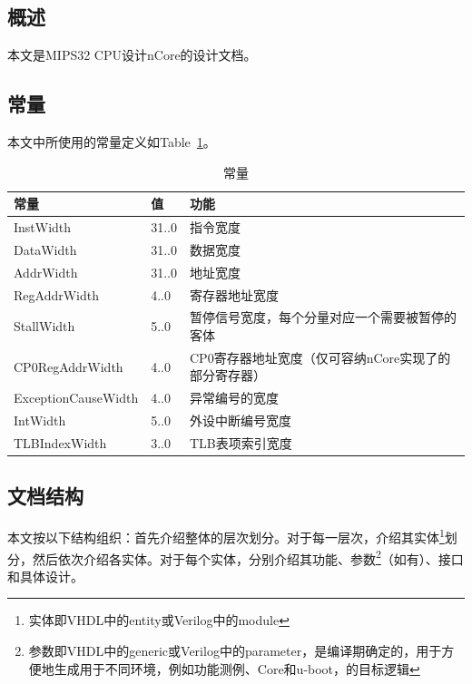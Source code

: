 \documentclass{article}
\begin{document}
\begin{spacing}{1.4}


\section{概述}

本文是MIPS32 CPU设计nCore的设计文档。

\subsection{常量}

本文中所使用的常量定义如Table~\ref{tb:constants}。
\begin{table}[!htb]
\begin{center}
\begin{tabular*}{15cm}{l|l|p{10cm}}  
\hline  
\textbf{常量}&\textbf{值}&\textbf{功能} \\
\hline InstWidth            & 31..0    & 指令宽度 \\
\hline DataWidth            & 31..0    & 数据宽度 \\
\hline AddrWidth            & 31..0    & 地址宽度 \\
\hline RegAddrWidth         & 4..0     & 寄存器地址宽度 \\
\hline StallWidth           & 5..0     & 暂停信号宽度，每个分量对应一个需要被暂停的客体 \\
\hline CP0RegAddrWidth      & 4..0     & CP0寄存器地址宽度（仅可容纳nCore实现了的部分寄存器） \\
\hline ExceptionCauseWidth  & 4..0     & 异常编号的宽度 \\
\hline IntWidth             & 5..0     & 外设中断编号宽度 \\
\hline TLBIndexWidth        & 3..0     & TLB表项索引宽度 \\
\hline 
\end{tabular*}  
\caption{常量}
\label{tb:constants}
\end{center}
\end{table}

\subsection{文档结构}

本文按以下结构组织：首先介绍整体的层次划分。对于每一层次，介绍其实体\footnote{实体即VHDL中的entity或Verilog中的module}划分，然后依次介绍各实体。对于每个实体，分别介绍其功能、参数\footnote{参数即VHDL中的generic或Verilog中的parameter，是编译期确定的，用于方便地生成用于不同环境，例如功能测例、\textmu Core和u-boot，的目标逻辑}（如有）、接口和具体设计。


\end{spacing}
\end{document}
